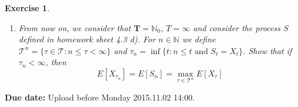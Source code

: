 \documentclass[DIV=classic,a4paper,10pt]{scrartcl}
\newtheorem{exercise}[theorem]{Exercise}
\theoremstyle{nonumberplain}
\newtheorem{proof}{Proof}
\numberwithin{equation}{section}
\begin{document}
\begin{exercise}
\begin{enumerate}[label=\text{\alph*)}, fullwidth]
            The process $X$ is given by
            \begin{equation*}
                X_0\equiv 10,\quad
                X_1(\omega)=
                \begin{cases}
                    5 &\text{if }\omega \in \{\omega_1,\omega_2\}\\
                    30 &\text{otherwise }
                \end{cases},\quad
                X_3(\omega)=
                \begin{cases}
                   5  & \text{if } \omega=\omega_1 \\
                   15 & \text{if } \omega=\omega_2 \\
                   10 & \text{if } \omega=\omega_3 \\
                   30 & \text{if } \omega=\omega_4 
                \end{cases}
            \end{equation*}
            compute $\tau_0$ and $\tau_1$.
        \item From now on, we consider that $\mathbf{T}=\mathbb{N}_0$, $T=\infty$ and consider the process $S$ defined in homework sheet 4.3 d).
            For $n \in \mathbb{N}$ we define $\mathcal{T}^n=\{\tau\in \mathcal{T}\colon n\leq \tau <\infty\}$ and $\tau_n=\inf\{t\colon n \leq t \text{ and }S_t=X_t\}$.
            Show that if $\tau_n <\infty$, then
            \begin{equation*}
                E\left[ X_{\tau_n} \right]=E\left[ S_n \right]=\max_{\tau \in \mathcal{T}^n}E\left[ X_{\tau} \right]
            \end{equation*}
    \end{enumerate}
\end{exercise}
    


\smallskip
\noindent
\textbf{Due date:} Upload before Monday 2015.11.02 14:00.
\end{document}
